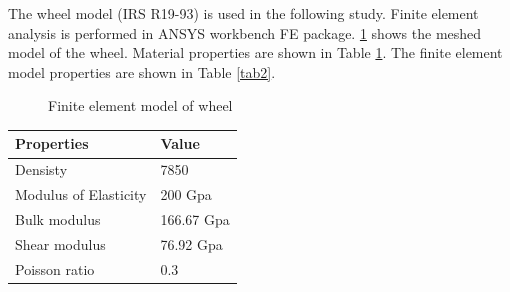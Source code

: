 \documentclass[]{interact}
\theoremstyle{plain}%
\theoremstyle{definition}
\theoremstyle{remark}
\begin{document}
The wheel model (IRS R19-93) is used in the following study. Finite element analysis is performed in ANSYS workbench FE package. \cref{fig:Meshwheel} shows the meshed model of the wheel. Material properties are shown in Table \ref{tab1}. The finite element model properties are shown in Table \ref{tab2}.
\begin{figure}[h]
\centering
{}
\caption{Finite element model of wheel} \label{fig:Meshwheel}
\end{figure}

\begin{table}[h]
{\begin{tabular}{ll}
\toprule
Properties & Value\\
 \midrule
 Densisty & 7850  \\ 
 Modulus of Elasticity & 200 Gpa  \\ 
 Bulk modulus & 166.67 Gpa  \\ 
 Shear modulus & 76.92 Gpa  \\ 
Poisson ratio &	0.3  \\

\bottomrule
\end{tabular}}
\label{tab1}
\end{table}
\end{document}
